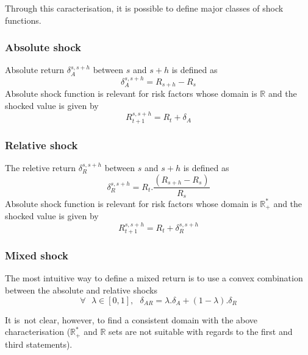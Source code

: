 \documentclass[3pt]{article}
\begin{document}
Through this caracterisation, it is possible to define major classes of
shock functions.

\subsubsection{Absolute shock}

Absolute return $\delta _{A}^{s,s+h}$ between $s$ and $s+h$ is defined as%
\begin{equation*}
\delta _{A}^{s,s+h}=R_{s+h}-R_{s}
\end{equation*}%
Absolute shock function is relevant for risk factors whose domain is $%
\mathbb{R}$ and the shocked value is given by 
\begin{equation*}
R_{t+1}^{s,s+h}=R_{t}+\delta _{A}
\end{equation*}

\subsubsection{Relative shock}

The reletive return $\delta _{R}^{s,s+h}$ between $s$ and $s+h$ is defined as%
\begin{equation*}
\delta _{R}^{s,s+h}=R_{t}.\frac{\left( R_{s+h}-R_{s}\right) }{R_{s}}
\end{equation*}%
Absolute shock function is relevant for risk factors whose domain is $%
\mathbb{R}_{+}^{\ast }$ and the shocked value is given by 
\begin{equation*}
R_{t+1}^{s,s+h}=R_{t}+\delta _{R}^{s,s+h}
\end{equation*}

\subsubsection{Mixed shock}

The most intuitive way to define a mixed return is to use a convex
combination between the absolute and relative shocks 
\begin{equation*}
\forall \text{ }\lambda \in \left[ 0,1\right] ,\text{ \ \ }\delta
_{AR}=\lambda .\delta _{A}+(1-\lambda ).\delta _{R}
\end{equation*}

It is\ not clear, however, to find a consistent domain with the above
characterisation ($\mathbb{R}_{+}^{\ast }$ and $\mathbb{R}$ sets are not
suitable with regards to the first and third statements). 

\bigskip 
\end{document}
